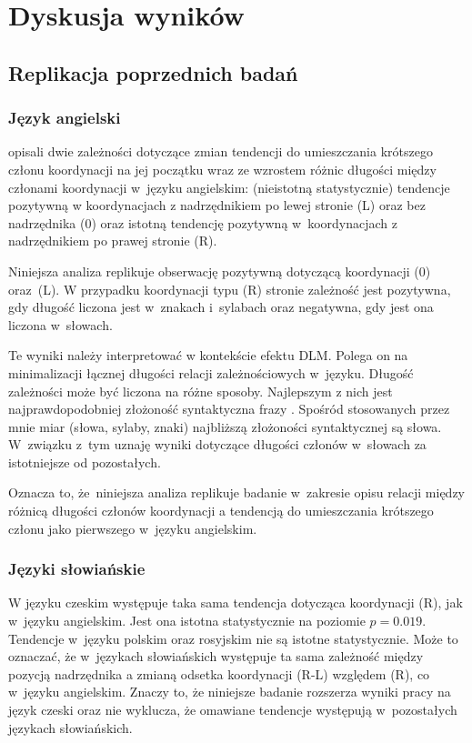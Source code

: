 \chapter{Dyskusja wyników} \label{ch6}

\section{Replikacja poprzednich badań}

\subsection{Język angielski}

\cite{przepiorkowski2023conjunct} opisali dwie zależności dotyczące zmian tendencji do umieszczania krótszego członu koordynacji na jej początku wraz ze wzrostem różnic długości między członami koordynacji w~języku angielskim: (nieistotną statystycznie) tendencje pozytywną w koordynacjach z nadrzędnikiem po lewej stronie (L) oraz bez nadrzędnika (0) oraz istotną tendencję pozytywną w~koordynacjach z nadrzędnikiem po prawej stronie (R).

Niniejsza analiza replikuje obserwację pozytywną dotyczącą koordynacji (0) oraz~(L). W przypadku koordynacji typu (R) stronie zależność jest pozytywna, gdy długość liczona jest w~znakach i~sylabach oraz negatywna, gdy jest ona liczona w~słowach.

Te wyniki należy interpretować w kontekście efektu DLM. Polega on na minimalizacji łącznej długości relacji zależnościowych w~języku. Długość zależności może być liczona na różne sposoby. Najlepszym z nich jest najprawdopodobniej złożoność syntaktyczna frazy \citep{lohmann2014english}. Spośród stosowanych przez mnie miar (słowa, sylaby, znaki) najbliższą złożoności syntaktycznej są słowa. W~związku z~tym uznaję wyniki dotyczące długości członów w~słowach za istotniejsze od pozostałych.

Oznacza to, że~niniejsza analiza replikuje badanie \cite{przepiorkowski2023conjunct} w~zakresie opisu relacji między różnicą długości członów koordynacji a tendencją do umieszczania krótszego członu jako pierwszego w~języku angielskim.

\subsection{Języki słowiańskie}

W języku czeskim występuje taka sama tendencja dotycząca koordynacji (R), jak w~języku angielskim. Jest ona istotna statystycznie na poziomie $p=0.019$. Tendencje w~języku polskim oraz rosyjskim nie są istotne statystycznie. Może to oznaczać, że w~językach słowiańskich występuje ta sama zależność między pozycją nadrzędnika a zmianą odsetka koordynacji (R-L) względem (R), co w~języku angielskim. Znaczy to, że niniejsze badanie rozszerza wyniki pracy \cite{przepiorkowski2023conjunct} na język czeski oraz nie wyklucza, że omawiane tendencje występują w~pozostałych językach słowiańskich.

